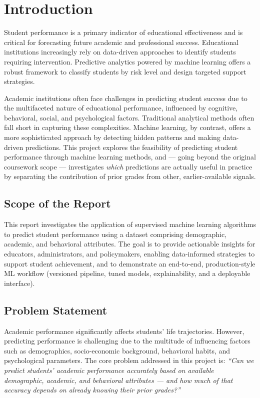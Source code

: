 \documentclass[12pt, a4paper]{article}
\begin{document}
\section{Introduction}
Student performance is a primary indicator of educational effectiveness and is critical for
forecasting future academic and professional success. Educational institutions increasingly
rely on data-driven approaches to identify students requiring intervention. Predictive
analytics powered by machine learning offers a robust framework to classify students by risk
level and design targeted support strategies.

Academic institutions often face challenges in predicting student success due to the
multifaceted nature of educational performance, influenced by cognitive, behavioral, social,
and psychological factors. Traditional analytical methods often fall short in capturing these
complexities. Machine learning, by contrast, offers a more sophisticated approach by detecting
hidden patterns and making data-driven predictions. This project explores the feasibility of
predicting student performance through machine learning methods, and — going beyond the
original coursework scope — investigates \emph{which} predictions are actually useful in
practice by separating the contribution of prior grades from other, earlier-available signals.

\subsection*{Scope of the Report}
This report investigates the application of supervised machine learning algorithms to predict
student performance using a dataset comprising demographic, academic, and behavioral
attributes. The goal is to provide actionable insights for educators, administrators, and
policymakers, enabling data-informed strategies to support student achievement, and to
demonstrate an end-to-end, production-style ML workflow (versioned pipeline, tuned models,
explainability, and a deployable interface).

\subsection*{Problem Statement}
Academic performance significantly affects students' life trajectories. However, predicting
performance is challenging due to the multitude of influencing factors such as demographics,
socio-economic background, behavioral habits, and psychological parameters. The core problem
addressed in this project is: \emph{``Can we predict students' academic performance accurately
based on available demographic, academic, and behavioral attributes — and how much of that
accuracy depends on already knowing their prior grades?''}
\end{document}
